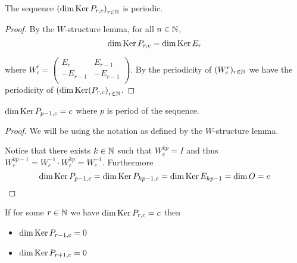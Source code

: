 \begin{proposition}
  The sequence $\left(\dim \operatorname{Ker} P_{r,c}\right)_{r\in\mathbb{N}}$
  is periodic.
\end{proposition}

\begin{proof}
  By the $W$-structure lemma, for all $n\in\mathbb{N}$,
  \[
  \dim\operatorname{Ker} P_{r,c}
  =
  \dim\operatorname{Ker} E_{r}
  \]

  where $W_{c}^{r}=\left(\begin{smallmatrix} E_{r} & E_{r-1}  \\ -E_{r-1} & -E_{r-1} \\\end{smallmatrix}\right)$.
  By the periodicity of $(W_{c}^{r})_{r\in\mathbb{N}}$ we have the
  periodicity of
  $\left(\dim\operatorname{Ker}(P_{r,c}\right)_{r\in\mathbb{N}}$.
\end{proof}

\begin{lemma}
  $\dim\operatorname{Ker} P_{p-1,c} = c$ where $p$ is period of the sequence.
\end{lemma}

\begin{proof}
  We will be using the notation as defined by the $W$-structure lemma.

  Notice that there exists $k\in\mathbb{N}$ such that $W_{c}^{kp} = I$ and
  thus $W_{c}^{kp-1} = W_{c}^{-1} \cdot W_{c}^{kp} = W_{c}^{-1}$.
  Furthermore
  \[
  \dim\operatorname{Ker} P_{p-1,c}
  =
  \dim\operatorname{Ker} P_{kp-1,c}
  =
  \dim\operatorname{Ker} E_{kp-1} = \dim O
  = c
  \]
\end{proof}

\begin{lemma}
  If for some $r\in\mathbb{N}$ we have $\dim\operatorname{Ker} P_{r,c} = c$ then
  \begin{itemize}
    \item $\dim\operatorname{Ker} P_{r-1,c} = 0$
    \item $\dim\operatorname{Ker} P_{r+1,c} = 0$
  \end{itemize}
\end{lemma}

